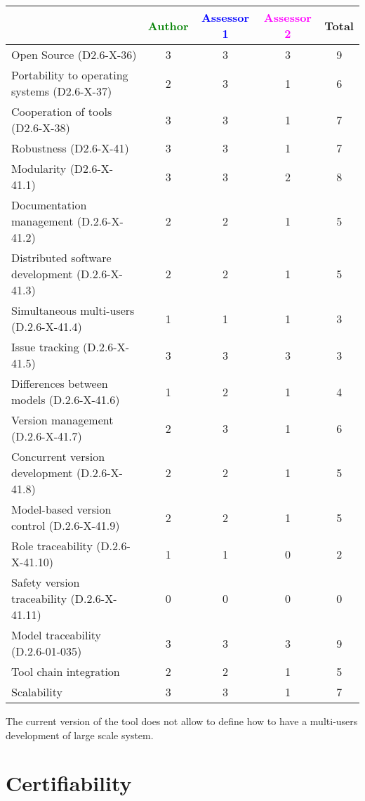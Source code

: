 \begin{tabular}{|l | c | c | c | c|}
\hline
& \textcolor{green}{Author} & \textcolor{blue}{Assessor 1} & \textcolor{magenta}{Assessor 2} & Total \\
\hline 
Open Source (D2.6-X-36) & 3 & 3 & 3 & 9  \\
\hline 
Portability to operating systems (D2.6-X-37) & 2 & 3 & 1 & 6  \\
\hline
Cooperation of tools (D2.6-X-38) & 3 & 3 & 1 & 7 \\
\hline
Robustness (D2.6-X-41) & 3 & 3 & 1 & 7 \\
\hline
Modularity (D2.6-X-41.1) & 3 & 3 & 2 & 8 \\
\hline
Documentation management (D.2.6-X-41.2) & 2 & 2 & 1 & 5 \\
\hline
Distributed software development (D.2.6-X-41.3)  & 2 & 2 & 1 & 5 \\
\hline
Simultaneous multi-users (D.2.6-X-41.4)   & 1 & 1 & 1 & 3 \\
\hline
Issue tracking (D.2.6-X-41.5) & 3 & 3 & 3 & 3 \\
\hline
Differences between models (D.2.6-X-41.6) & 1 & 2 & 1 & 4 \\
\hline
Version management (D.2.6-X-41.7) & 2 & 3 & 1 & 6 \\
\hline
Concurrent version development (D.2.6-X-41.8) & 2 & 2 & 1 & 5 \\
\hline
Model-based version control (D.2.6-X-41.9) & 2 & 2 & 1 & 5 \\
\hline
Role traceability (D.2.6-X-41.10) & 1 & 1 & 0 & 2 \\
\hline
Safety version traceability (D.2.6-X-41.11) & 0 & 0 & 0 & 0 \\
\hline
Model traceability (D.2.6-01-035) & 3 & 3 & 3 & 9 \\
\hline
Tool chain integration & 2 & 2 & 1 & 5 \\
\hline
Scalability & 3 & 3 & 1 & 7 \\
\hline
\end{tabular}

\begin{assessor2}
The current version of the tool does not allow to  define how to  have a multi-users development of large scale system.
\end{assessor2}

\section{Certifiability}


